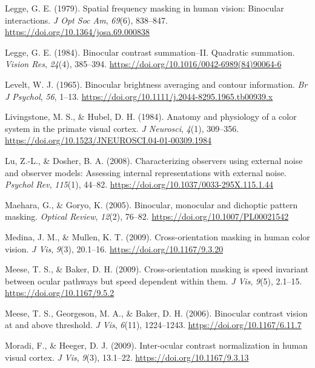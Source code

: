 \documentclass[
  letterpaper,
  DIV=11,
  numbers=noendperiod]{scrartcl}
\newlength{\cslhangindent}
\newenvironment{CSLReferences}[2] %
 {\begin{list}{}{%
  \setlength{\itemindent}{0pt}
  \setlength{\leftmargin}{0pt}
  \setlength{\parsep}{0pt}
  \ifodd #1
   \setlength{\leftmargin}{\cslhangindent}
   \setlength{\itemindent}{-1\cslhangindent}
  \fi
  \setlength{\itemsep}{#2\baselineskip}}}
 {\end{list}}
\begin{document}
\begin{CSLReferences}{1}{0}
Legge, G. E. (1979). Spatial frequency masking in human vision:
Binocular interactions. \emph{J Opt Soc Am}, \emph{69}(6), 838--847.
\url{https://doi.org/10.1364/josa.69.000838}

Legge, G. E. (1984). Binocular contrast summation--II. Quadratic
summation. \emph{Vision Res}, \emph{24}(4), 385--394.
\url{https://doi.org/10.1016/0042-6989(84)90064-6}

Levelt, W. J. (1965). Binocular brightness averaging and contour
information. \emph{Br J Psychol}, \emph{56}, 1--13.
\url{https://doi.org/10.1111/j.2044-8295.1965.tb00939.x}

Livingstone, M. S., \& Hubel, D. H. (1984). Anatomy and physiology of a
color system in the primate visual cortex. \emph{J Neurosci},
\emph{4}(1), 309--356.
\url{https://doi.org/10.1523/JNEUROSCI.04-01-00309.1984}

Lu, Z.-L., \& Dosher, B. A. (2008). Characterizing observers using
external noise and observer models: Assessing internal representations
with external noise. \emph{Psychol Rev}, \emph{115}(1), 44--82.
\url{https://doi.org/10.1037/0033-295X.115.1.44}

Maehara, G., \& Goryo, K. (2005). Binocular, monocular and dichoptic
pattern masking. \emph{Optical Review}, \emph{12}(2), 76--82.
\url{https://doi.org/10.1007/PL00021542}

Medina, J. M., \& Mullen, K. T. (2009). Cross-orientation masking in
human color vision. \emph{J Vis}, \emph{9}(3), 20.1--16.
\url{https://doi.org/10.1167/9.3.20}

Meese, T. S., \& Baker, D. H. (2009). Cross-orientation masking is speed
invariant between ocular pathways but speed dependent within them.
\emph{J Vis}, \emph{9}(5), 2.1--15. \url{https://doi.org/10.1167/9.5.2}

Meese, T. S., Georgeson, M. A., \& Baker, D. H. (2006). Binocular
contrast vision at and above threshold. \emph{J Vis}, \emph{6}(11),
1224--1243. \url{https://doi.org/10.1167/6.11.7}

Moradi, F., \& Heeger, D. J. (2009). Inter-ocular contrast normalization
in human visual cortex. \emph{J Vis}, \emph{9}(3), 13.1--22.
\url{https://doi.org/10.1167/9.3.13}


\end{CSLReferences}
\end{document}
